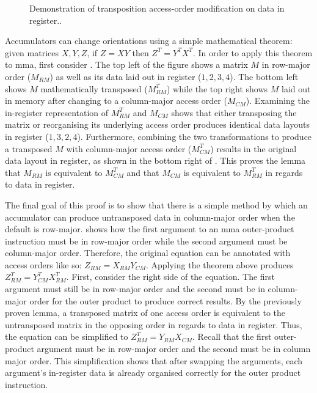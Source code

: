 \documentclass[\main/thesis.tex]{subfiles}
\begin{document}
\begin{figure}[t]
  \caption[Effects of Transposition and Access-Order Modification]{Demonstration of transposition access-order modification on data in register..}
  \label{fig:orderAndTranspose}
\end{figure}

Accumulators can change orientations using a simple mathematical theorem: given matrices $X, Y, Z$, if $Z = XY$ then $Z^T=Y^TX^T$.
In order to apply this theorem to \gls{mma}, first consider .
The top left of the figure shows a matrix $M$ in row-major order ($M_{RM}$) as well as its data laid out in register ($1, 2, 3, 4$).
The bottom left shows $M$ mathematically transposed ($M_{RM}^T$) while the top right shows $M$ laid out in memory after changing to a column-major access order ($M_{CM}$).
Examining the in-register representation of $M_{RM}^T$ and $M_{CM}$ shows that either transposing the matrix or reorganising its underlying access order produces identical data layouts in register ($1, 3, 2, 4$).
Furthermore, combining the two transformations to produce a transposed $M$ with column-major access order ($M_{CM}^T$) results in the original data layout in register, as shown in the bottom right of .
This proves the lemma that $M_{RM}$ is equivalent to $M^T_{CM}$ and that $M_{CM}$ is equivalent to $M^T_{RM}$ in regards to data in register.

The final goal of this proof is to show that there is a simple method by which an accumulator can produce untransposed data in column-major order when the default is row-major.
 shows how the first argument to an \gls{mma} outer-product instruction must be in row-major order while the second argument must be column-major order.
Therefore, the original equation can be annotated with access orders like so: $Z_{RM} = X_{RM} Y_{CM}$.
Applying the theorem above produces $Z^T_{RM} = Y^T_{CM} X^T_{RM}$.
First, consider the right side of the equation.
The first argument must still be in row-major order and the second must be in column-major order for the outer product to produce correct results.
By the previously proven lemma, a transposed matrix of one access order is equivalent to the untransposed matrix in the opposing order in regards to data in register.
Thus, the equation can be simplified to $Z^T_{RM} = Y_{RM}X_{CM}$.
Recall that the first outer-product argument must be in row-major order and the second must be in column major order.
This simplification shows that after swapping the arguments, each argument's in-register data is already organised correctly for the outer product instruction.
\end{document}
